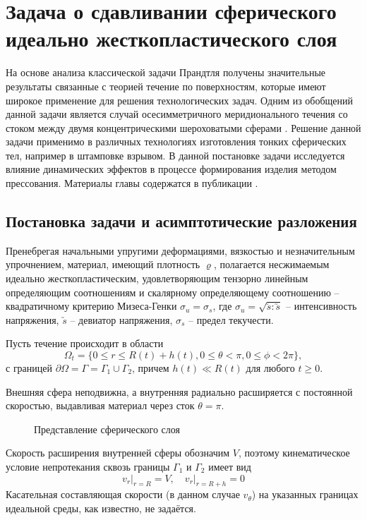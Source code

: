\chapter{Задача о сдавливании сферического идеально жесткопластического слоя}\label{ch:ch3}
На основе анализа классической задачи Прандтля \autocite{Prandtl:1948} получены значительные результаты связанные с теорией течение по поверхностям, которые имеют широкое применение для решения технологических задач. Одним из обобщений данной задачи является случай осесимметричного меридионального течения со стоком между двумя концентрическими шероховатыми сферами \autocite{Georgievsky:2011}.
Решение данной задачи применимо в различных технологиях изготовления тонких сферических тел, например в штамповке взрывом.
В данной постановке задачи исследуется влияние динамических эффектов в процессе формирования изделия методом прессования. Материалы главы содержатся в публикации \autocite{Shabaykin:2020a}.

\section{Постановка задачи и асимптотические разложения}\label{sec:ch3/sec1}

Пренебрегая начальными упругими деформациями, вязкостью и незначительным упрочнением, материал, имеющий плотность $\varrho$, полагается несжимаемым идеально жесткопластическим, удовлетворяющим тензорно линейным определяющим соотношениям и скалярному определяющему соотношению -- квадратичному критерию Мизеса-Генки $\sigma_{u} = \sigma_{s}$, где $\sigma_{u} = \sqrt{\utilde{s} : \utilde{s}}$ -- интенсивность напряжения, $\utilde{s}$ -- девиатор напряжения, $\sigma_{s}$ -- предел текучести.

Пусть течение происходит в области
\begin{equation}
  \Omega_{t} = \{0 \le r \le R(t)+ h(t), 0 \le \theta < \pi, 0 \le \phi < 2\pi\},
\end{equation}
с границей $\partial\Omega = \Gamma = \Gamma_{1} \cup \Gamma_{2}$, причем $h(t) \ll R(t)$ для любого $t \ge 0$.

Внешняя сфера неподвижна, а внутренняя радиально расширяется с постоянной скоростью, выдавливая материал через сток $\theta=\pi$.

\begin{figure}[ht]
  \caption{Представление сферического слоя}
  \label{fig:ch3/layer/circle}
\end{figure}
Скорость расширения внутренней сферы обозначим $V$, поэтому кинематическое условие непротекания сквозь границы $\Gamma_{1}$ и $\Gamma_{2}$ имеет вид
\begin{equation}
  \label{eq:ch3/sec1/boundary/kinematic}
  v_{r}\lvert_{r=R} = V, \quad v_{r}\lvert_{r=R + h} = 0
\end{equation}
Касательная составляющая скорости (в данном случае $v_{\theta}$) на указанных границах идеальной среды, как известно, не задаётся.

